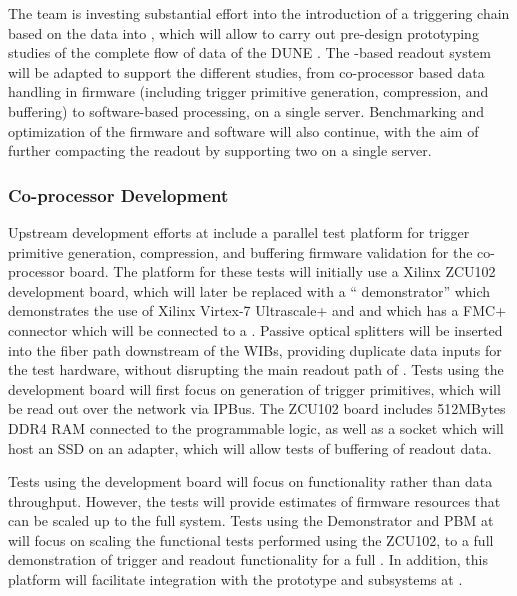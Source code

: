 The  team is investing substantial effort into the introduction of
a triggering chain based on the  data into , which will
allow to carry out pre-design prototyping studies of the complete flow
of data of the DUNE .  
The -based readout system will be adapted to support the
different studies, from co-processor based data handling in firmware
(including trigger primitive generation, compression, and buffering) to software-based processing, on a single
server. Benchmarking and optimization of the  firmware and
software will also continue, with the aim of further compacting the
readout by supporting two  on a single server. 

\subsubsection{Co-processor Development}


Upstream  development efforts at  include a parallel test 
platform for trigger
primitive generation, compression, and buffering firmware validation for
the co-processor board.  The platform for these tests will initially
use a Xilinx ZCU102 development board, which will later be replaced
with a `` demonstrator'' which demonstrates the use
of Xilinx Virtex-7 Ultrascale+  and  and which has a FMC+
connector which will be connected to a .
Passive optical splitters
will be inserted into the fiber path downstream of the WIBs, providing
duplicate data inputs for the test hardware, without disrupting the
main readout path of . Tests using the development board will
first focus on generation of trigger primitives, which will be read
out over the network via IPBus\cite{Larrea:2015wra}. The ZCU102 board
includes 512MBytes DDR4 RAM connected to the  programmable logic,
as well as a  socket which will host an  SSD on an adapter,
which will allow tests of buffering  of readout
data. 

Tests using the development board will focus on functionality
rather than data throughput. However, the tests will provide estimates
of firmware resources that can be scaled up to the full system. Tests
using the  Demonstrator and PBM at  will focus on
scaling the functional tests performed using the ZCU102, to a full
demonstration of trigger and readout functionality for a full . In
addition, this platform will facilitate integration with the prototype
 and  subsystems
at . 


